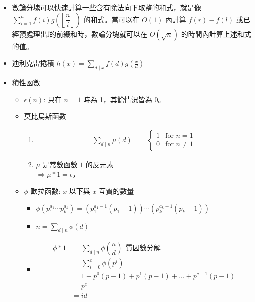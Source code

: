 
\begin{itemize}
\item 數論分塊可以快速計算一些含有除法向下取整的和式，就是像 $\sum_{i = 1} ^ {n} f(i) g(\left\lfloor\dfrac ni\right\rfloor)$ 的和式。當可以在 $O(1)$ 內計算 $f(r) - f(l)$ 或已經預處理出f的前綴和時，數論分塊就可以在 $O(\sqrt n)$ 的時間內計算上述和式的值。
\item 迪利克雷捲積 $h(x) = \sum_{d \mid x} f(d) g(\frac{x}{d})$
\item 積性函數
    \begin{itemize}
        \item $\epsilon (n)$: 只在 $n = 1$ 時為 1，其餘情況皆為 0。
        \item 莫比烏斯函數
            \begin{enumerate}
                \item $$
                    \begin{aligned}
                        \sum_{d \mid n} \mu (d)
                        &=
                        \begin{cases}
                            1 & \text{for } n = 1\\
                            0 & \text{for } n \neq 1
                        \end{cases}
                    \end{aligned}
                    $$

                \item $\mu$ 是常數函數 $1$ 的反元素\\
                    $\Rightarrow \mu \ast 1 = \epsilon$，
            \end{enumerate}

        \item $\phi$ 歐拉函數: $x$ 以下與 $x$ 互質的數量
        \begin{itemize}
            \item $\phi(p_1^{a_1} \cdots p_k^{a_k}) = (p_1^{a_1 - 1} (p_1 - 1)) \cdots (p_k^{a_k - 1} (p_k - 1))$
            \item $n = \sum_{d \mid n} \phi(d)$
            \item $$
                \begin{aligned}
                \phi \ast 1
                &= \sum_{d \mid n} \phi(\dfrac {n}{d}) \ \ \text{質因數分解}\\
                &= \sum_{i = 0} ^ {c} \phi(p ^ i)\\
                &= 1 + p^0(p-1) + p^1(p-1) + ... + p^{c-1}(p-1)\\
                &= p^c\\
                &= id
                \end{aligned}
                $$
        \end{itemize}
    \end{itemize}


\end{itemize}
